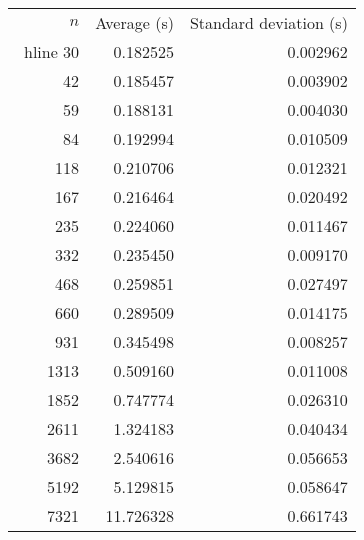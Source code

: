 \begin{tabular}{rrr}
$n$& Average (s) & Standard deviation (s)\\\ hline
30& 0.182525& 0.002962\\
42& 0.185457& 0.003902\\
59& 0.188131& 0.004030\\
84& 0.192994& 0.010509\\
118& 0.210706& 0.012321\\
167& 0.216464& 0.020492\\
235& 0.224060& 0.011467\\
332& 0.235450& 0.009170\\
468& 0.259851& 0.027497\\
660& 0.289509& 0.014175\\
931& 0.345498& 0.008257\\
1313& 0.509160& 0.011008\\
1852& 0.747774& 0.026310\\
2611& 1.324183& 0.040434\\
3682& 2.540616& 0.056653\\
5192& 5.129815& 0.058647\\
7321& 11.726328& 0.661743\\
\end{tabular}
